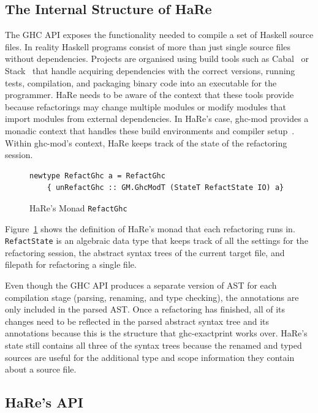 \subsection{The Internal Structure of HaRe}
\label{hareInners}

The GHC API exposes the functionality needed to compile a set of Haskell source files. In reality Haskell programs consist of more than just single source files without dependencies. Projects are organised using build tools such as Cabal~\citep{cabal} or Stack~\citep{stack} that handle acquiring dependencies with the correct versions, running tests, compilation, and packaging binary code into an executable for the programmer. HaRe needs to be aware of the context that these tools provide because refactorings may change multiple modules or modify modules that import modules from external dependencies. In HaRe's case, ghc-mod provides a monadic context that handles these build environments and compiler setup~\citep{ghcMod}. Within ghc-mod's context, HaRe keeps track of the state of the refactoring session.

\begin{figure}[t]
\begin{lstlisting}
newtype RefactGhc a = RefactGhc
    { unRefactGhc :: GM.GhcModT (StateT RefactState IO) a}
\end{lstlisting}
\caption{HaRe's Monad \texttt{RefactGhc}}
\label{refactghc}
\end{figure}

Figure~\ref{refactghc} shows the definition of HaRe's monad that each refactoring runs in. \texttt{RefactState} is an algebraic data type that keeps track of all the settings for the refactoring session, the abstract syntax trees of the current target file, and filepath for refactoring a single file.

Even though the GHC API produces a separate version of AST for each compilation stage (parsing, renaming, and type checking), the annotations are only included in the parsed AST. Once a refactoring has finished, all of its changes need to be reflected in the parsed abstract syntax tree and its annotations because this is the structure that ghc-exactprint works over. HaRe's state still contains all three of the syntax trees because the renamed and typed sources are useful for the additional type and scope information they contain about a source file. 

\subsection{HaRe's API}

